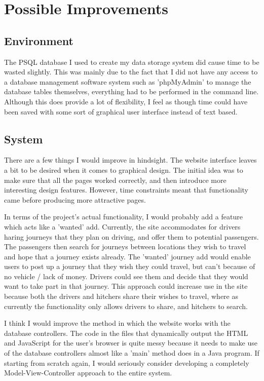 \section{Possible Improvements}
\subsection{Environment}
The PSQL database I used to create my data storage system did cause time to be wasted slightly. This was mainly due to the fact that I did not have any access to a database management software system such as 'phpMyAdmin'\cite{php_my_admin} to manage the database tables themselves, everything had to be performed in the command line. Although this does provide a lot of flexibility, I feel as though time could have been saved with some sort of graphical user interface instead of text based.

\subsection{System}
There are a few things I would improve in hindsight. The website interface leaves a bit to be desired when it comes to graphical design. The initial idea was to make sure that all the pages worked correctly, and then introduce more interesting design features. However, time constraints meant that functionality came before producing more attractive pages.

In terms of the project's actual functionality, I would probably add a feature which acts like a 'wanted' add. Currently, the site accommodates for drivers haring journeys that they plan on driving, and offer them to potential passengers. The passengers then search for journeys between locations they wish to travel and hope that a journey exists already. The 'wanted' journey add would enable users to post up a journey that they wish they could travel, but can't because of no vehicle / lack of money. Drivers could see them and decide that they would want to take part in that journey. This approach could increase use in the site because both the drivers and hitchers share their wishes to travel, where as currently the functionality only allows drivers to share, and hitchers to search.

I think I would improve the method in which the website works with the database controllers. The code in the files that dynamically output the HTML and JavaScript for the user's browser is quite messy because it needs to make use of the database controllers almost like a 'main' method does in a Java program. If starting from scratch again, I would seriously consider developing a completely Model-View-Controller approach to the entire system.

